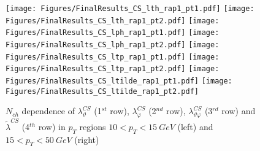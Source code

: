 \documentclass[12pt]{article}
\newcommand{\lamthCS}{\lambda^{\scriptscriptstyle CS}_\vartheta}
\newcommand{\lamphCS}{\lambda^{\scriptscriptstyle CS}_\varphi}
\newcommand{\lamthphCS}{\lambda^{\scriptscriptstyle CS}_{\vartheta \varphi}}
\newcommand{\lamtildeCS}{\tilde{\lambda}^{\scriptscriptstyle CS}}
\begin{document}
\begin{figure}[htbp]
\centering
\texttt{[image: Figures/FinalResults\_CS\_lth\_rap1\_pt1.pdf]}
\texttt{[image: Figures/FinalResults\_CS\_lth\_rap1\_pt2.pdf]}
\texttt{[image: Figures/FinalResults\_CS\_lph\_rap1\_pt1.pdf]}
\texttt{[image: Figures/FinalResults\_CS\_lph\_rap1\_pt2.pdf]}
\texttt{[image: Figures/FinalResults\_CS\_ltp\_rap1\_pt1.pdf]}
\texttt{[image: Figures/FinalResults\_CS\_ltp\_rap1\_pt2.pdf]}
\texttt{[image: Figures/FinalResults\_CS\_ltilde\_rap1\_pt1.pdf]}
\texttt{[image: Figures/FinalResults\_CS\_ltilde\_rap1\_pt2.pdf]}
\caption{$N_{ch}$ dependence of $\lamthCS$
(1$^{st}$ row), $\lamphCS$ (2$^{nd}$ row), $\lamthphCS$ (3$^{rd}$ row) and 
$\lamtildeCS$ (4$^{th}$ row) in $p_T$ regions $10 < p_T < 15\ GeV$ (left) and
$15 < p_T < 50\ GeV$ (right)}
\end{figure}
\clearpage
\end{document}
